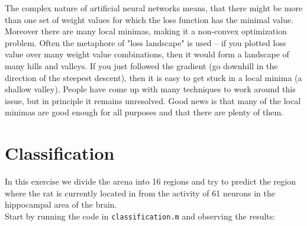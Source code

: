 \documentclass[a4paper,11pt]{article}
\begin{document}
The complex nature of artificial neural networks means, that there might be more than one set of weight values for which the loss function has the minimal value. Moreover there are many local minimas, making it a non-convex optimization problem. Often the metaphore of "loss landscape" is used -- if you plotted loss value over many weight value combinations, then it would form a landscape of many hills and valleys. If you just followed the gradient (go downhill in the direction of the steepest descent), then it is easy to get stuck in a local minima (a shallow valley). People have come up with many techniques to work around this issue, but in principle it remains unresolved. Good news is that many of the local minimas are good enough for all purposes and that there are plenty of them.

\newpage

%
%
\section{Classification}

In this exercise we divide the arena into 16 regions and try to predict the region where the rat is currently located in from the activity of 61 neurons in the hippocampal area of the brain.\\

Start by running the code in \texttt{classification.m} and observing the results:
\end{document}
